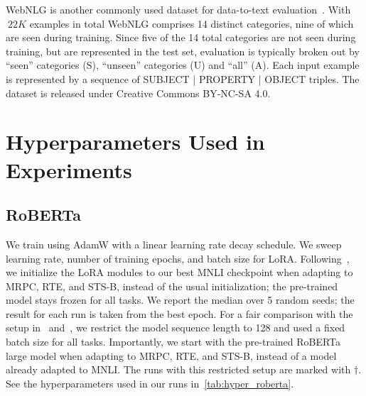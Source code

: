 \documentclass{article} %
\begin{document}
WebNLG
is another commonly used dataset for data-to-text evaluation~\citep{gardent2017webnlg}. With $~22K$ examples in total WebNLG comprises 14 distinct categories, nine of which are seen during training. Since five of the 14 total categories are not seen during training, but are represented in the test set, evaluation is typically broken out by ``seen'' categories (S),  ``unseen'' categories (U) and ``all'' (A). Each input example is represented by a sequence of SUBJECT | PROPERTY | OBJECT triples.
The dataset is released under Creative Commons BY-NC-SA 4.0.

\section{Hyperparameters Used in Experiments}

\subsection{RoBERTa}
\label{app:hps_roberta}

We train using AdamW with a linear learning rate decay schedule.
We sweep learning rate, number of training epochs, and batch size for LoRA.
Following~\citet{liu2019roberta}, we initialize the LoRA modules to our best MNLI checkpoint when adapting to MRPC, RTE, and STS-B, instead of the usual initialization; the pre-trained model stays frozen for all tasks.
We report the median over 5 random seeds; the result for each run is taken from the best epoch.
For a fair comparison with the setup in~\cite{houlsby_parameter-efficient_2019} and~\cite{pfeiffer2021adapterfusion}, we restrict the model sequence length to 128 and used a fixed batch size for all tasks.
Importantly, we start with the pre-trained RoBERTa large model when adapting to MRPC, RTE, and STS-B, instead of a model already adapted to MNLI.
The runs with this restricted setup are marked with $\dagger$.
See the hyperparameters used in our runs in~\autoref{tab:hyper_roberta}.
\end{document}
